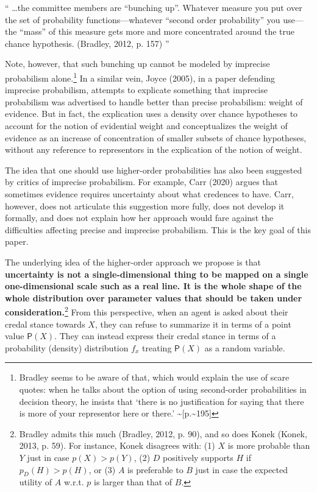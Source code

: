 \documentclass[
  10pt,
  dvipsnames,enabledeprecatedfontcommands]{scrartcl}
\renewenvironment{quote}
{\list{}{\leftmargin=1em\rightmargin=1em}\item[]``}
{''\endlist}
\begin{document}
\begin{quote}
\dots the committee members are ``bunching up''. Whatever measure you
put over the set of probability functions---whatever ``second order
probability'' you use---the ``mass'' of this measure gets more and more
concentrated around the true chance hypothesis. (Bradley, 2012, p. 157)
\end{quote}

\noindent Note, however, that such bunching up cannot be modeled by
imprecise probabilism alone.\footnote{Bradley seems to be aware of that,
  which would explain the use of scare quotes: when he talks about the
  option of using second-order probabilities in decision theory, he
  insists that `there is no justification for saying that there is more
  of your representor here or there.'
  \textasciitilde{[}p.\textasciitilde195{]}} In a similar vein, Joyce
(2005), in a paper defending imprecise probabilism, attempts to
explicate something that imprecise probabilism was advertised to handle
better than precise probabilism: weight of evidence. But in fact, the
explication uses a density over chance hypotheses to account for the
notion of evidential weight and conceptualizes the weight of evidence as
an increase of concentration of smaller subsets of chance hypotheses,
without any reference to representors in the explication of the notion
of weight.

The idea that one should use higher-order probabilities has also been
suggested by critics of imprecise probabilism. For example, Carr (2020)
argues that sometimes evidence requires uncertainty about what credences
to have. Carr, however, does not articulate this suggestion more fully,
does not develop it formally, and does not explain how her approach
would fare against the difficulties affecting precise and imprecise
probabilism. This is the key goal of this paper.

The underlying idea of the higher-order approach we propose is that
\textbf{uncertainty is not a single-dimensional thing to be mapped on a
single one-dimensional scale such as a real line. It is the whole shape
of the whole distribution over parameter values that should be taken
under consideration.}\footnote{Bradley admits this much (Bradley, 2012,
  p. 90), and so does Konek (Konek, 2013, p. 59). For instance, Konek
  disagrees with: (1) \(X\) is more probable than \(Y\) just in case
  \(p(X)>p(Y)\), (2) \(D\) positively supports \(H\) if
  \(p_D(H)> p(H)\), or (3) \(A\) is preferable to \(B\) just in case the
  expected utility of \(A\) w.r.t. \(p\) is larger than that of \(B\).}
From this perspective, when an agent is asked about their credal stance
towards \(X\), they can refuse to summarize it in terms of a point value
\(\mathsf{P}(X)\). They can instead express their credal stance in terms
of a probability (density) distribution \(f_x\) treating
\(\mathsf{P}(X)\) as a random variable.
\end{document}
